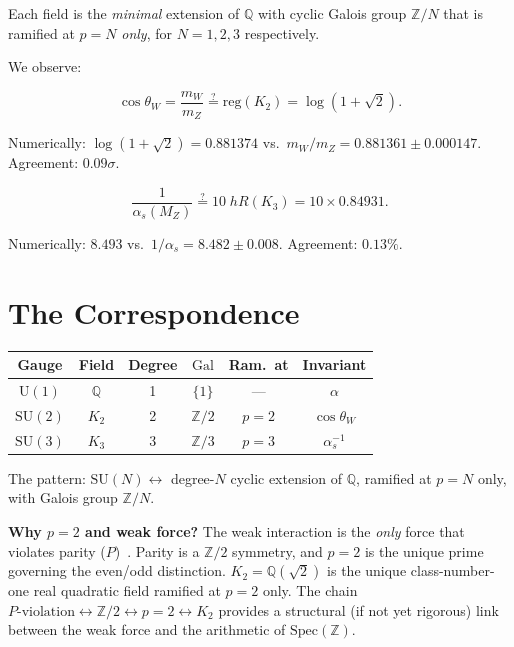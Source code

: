 \documentclass[aps,prl,twocolumn,superscriptaddress,nofootinbib]{revtex4-2}
\newcommand{\Spec}{\mathrm{Spec}}
\newcommand{\Gal}{\mathrm{Gal}}
\newcommand{\reg}{\mathrm{reg}}
\newcommand{\SU}{\mathrm{SU}}
\newcommand{\U}{\mathrm{U}}
\begin{document}
Each field is the \emph{minimal} extension of $\mathbb{Q}$ with
cyclic Galois group $\mathbb{Z}/N$ that is ramified at $p=N$
\emph{only}, for $N=1,2,3$ respectively.

We observe:

\begin{equation}\label{eq:cosW}
  \cos\theta_W = \frac{m_W}{m_Z} \stackrel{?}{=} \reg(K_2)
  = \log(1{+}\sqrt{2}).
\end{equation}

\noindent Numerically: $\log(1{+}\sqrt{2})=0.881374$ vs.\
$m_W/m_Z=0.881361\pm 0.000147$.  Agreement: $0.09\sigma$.

\begin{equation}\label{eq:alphas}
  \frac{1}{\alpha_s(M_Z)} \stackrel{?}{=} 10\;hR(K_3)
  = 10\times 0.84931.
\end{equation}

\noindent Numerically: $8.493$ vs.\ $1/\alpha_s=8.482\pm 0.008$.
Agreement: $0.13\%$.

\section{The Correspondence}

\begin{center}
\begin{tabular}{cccccc}
\toprule
Gauge & Field & Degree & $\Gal$ & Ram.\ at & Invariant \\
\midrule
$\U(1)$ & $\mathbb{Q}$ & 1 & $\{1\}$ & --- & $\alpha$ \\
$\SU(2)$ & $K_2$ & 2 & $\mathbb{Z}/2$ & $p{=}2$ & $\cos\theta_W$ \\
$\SU(3)$ & $K_3$ & 3 & $\mathbb{Z}/3$ & $p{=}3$ & $\alpha_s^{-1}$ \\
\bottomrule
\end{tabular}
\end{center}

The pattern: $\SU(N)\leftrightarrow$ degree-$N$ cyclic extension of
$\mathbb{Q}$, ramified at $p=N$ only, with Galois group
$\mathbb{Z}/N$.

\medskip
\noindent\textbf{Why $p=2$ and weak force?}
The weak interaction is the \emph{only} force that violates parity
($P$)~\cite{Wu1957}.  Parity is a $\mathbb{Z}/2$ symmetry, and
$p=2$ is the unique prime governing the even/odd distinction.
$K_2=\mathbb{Q}(\sqrt{2})$ is the unique class-number-one real
quadratic field ramified at $p=2$ only.  The chain
$P\text{-violation}\leftrightarrow\mathbb{Z}/2\leftrightarrow
p{=}2\leftrightarrow K_2$ provides a structural (if not yet
rigorous) link between the weak force and the arithmetic of
$\Spec(\mathbb{Z})$.
\end{document}
